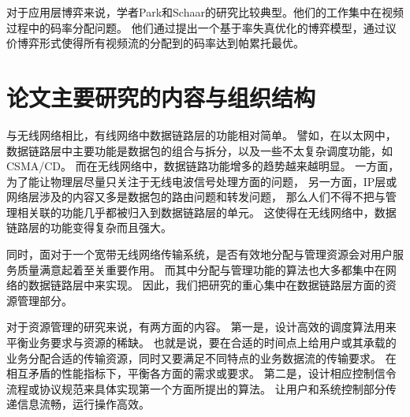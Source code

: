对于应用层博弈来说，学者Park和Schaar的研究比较典型。他们的工作集中在视频过程中的码率分配问题\cite{ParkSchaar:2007}\cite{ParkSchaar:2007ICASSP}。
他们通过提出一个基于率失真优化的博弈模型，通过议价博弈形式使得所有视频流的分配到的码率达到帕累托最优。

\section{论文主要研究的内容与组织结构}
与无线网络相比，有线网络中数据链路层的功能相对简单。
譬如，在以太网中，数据链路层中主要功能是数据包的组合与拆分，以及一些不太复杂调度功能，如CSMA/CD。
而在无线网络中，数据链路功能增多的趋势越来越明显。
一方面，为了能让物理层尽量只关注于无线电波信号处理方面的问题，
另一方面，IP层或网络层涉及的内容又多是数据包的路由问题和转发问题，
那么人们不得不把与管理相关联的功能几乎都被归入到数据链路层的单元。
这使得在无线网络中，数据链路层的功能变得复杂而且强大。

同时，面对于一个宽带无线网络传输系统，是否有效地分配与管理资源会对用户服务质量满意起着至关重要作用。
而其中分配与管理功能的算法也大多都集中在网络的数据链路层中来实现。
因此，我们把研究的重心集中在数据链路层方面的资源管理部分。

对于资源管理的研究来说，有两方面的内容。
第一是，设计高效的调度算法用来平衡业务要求与资源的稀缺。
也就是说，要在合适的时间点上给用户或其承载的业务分配合适的传输资源，同时又要满足不同特点的业务数据流的传输要求。
在相互矛盾的性能指标下，平衡各方面的需求或要求。
第二是，设计相应控制信令流程或协议规范来具体实现第一个方面所提出的算法。
让用户和系统控制部分传递信息流畅，运行操作高效。

